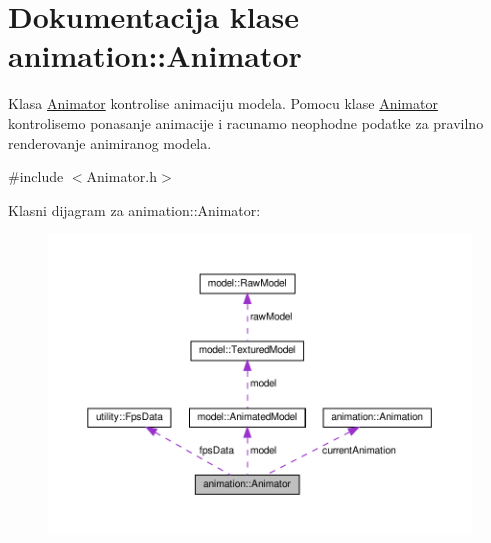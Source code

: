 \hypertarget{classanimation_1_1Animator}{}\section{Dokumentacija klase animation\+:\+:Animator}
\label{classanimation_1_1Animator}


Klasa \hyperlink{classanimation_1_1Animator}{Animator} kontrolise animaciju modela. Pomocu klase \hyperlink{classanimation_1_1Animator}{Animator} kontrolisemo ponasanje animacije i racunamo neophodne podatke za pravilno renderovanje animiranog modela.  




{\ttfamily \#include $<$Animator.\+h$>$}



Klasni dijagram za animation\+:\+:Animator\+:
\nopagebreak
\begin{figure}[H]
\begin{center}
\leavevmode
\includegraphics[width=350pt]{classanimation_1_1Animator__coll__graph}
\end{center}
\end{figure}
